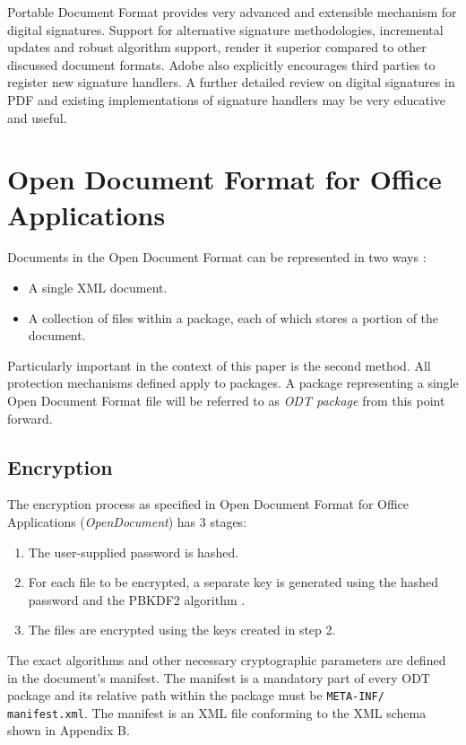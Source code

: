 \documentclass[11pt,oneside]{fithesis2}
\begin{document}
Portable Document Format provides very advanced and extensible mechanism for digital signatures. Support for alternative signature methodologies, incremental updates and robust algorithm support, render it superior compared to other discussed document formats. Adobe also explicitly encourages third parties to register new signature handlers. A further detailed review on digital signatures in PDF and existing implementations of signature handlers may be very educative and useful.  

\chapter{Open Document Format for Office Applications}

Documents in the Open Document Format can be represented in two ways \cite{odt_spec}:

\begin{itemize}
\setlength\itemsep{0.1em}
\item{A single XML document.}
\item{A collection of files within a package, each of which stores a portion of the document.}
\end{itemize}

Particularly important in the context of this paper is the second method. All protection mechanisms defined apply to packages. A package representing a single Open Document Format file will be referred to as \textit{ODT package} from this point forward.

\section{Encryption}\label{odt_enc}

The encryption process as specified in Open Document Format for Office Applications (\textit{OpenDocument}) \cite{odt_spec} has 3 stages:

\begin{enumerate}
\setlength\itemsep{0.1em}
	\item{The user-supplied password is hashed.}
	\item{For each file to be encrypted, a separate key is generated using the hashed password and the PBKDF2 algorithm \cite{rfc2898}.}
	\item{The files are encrypted using the keys created in step 2.}
\end{enumerate}

The exact algorithms and other necessary cryptographic parameters are defined in the document's manifest. The manifest is a mandatory part of every ODT package and its relative path within the package must be \texttt{META-INF/}
\texttt{manifest.xml}. The manifest is an XML file conforming to the XML schema shown in Appendix B.
\end{document}
